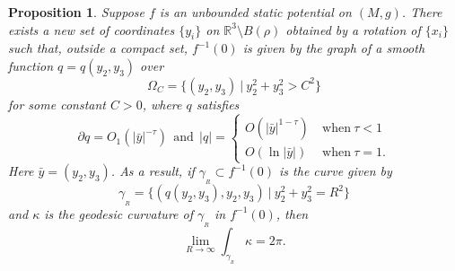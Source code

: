 \documentclass[12pt]{amsart}
\newtheorem{prop}{Proposition}[section]
\theoremstyle{remark}
\numberwithin{equation}{section}
\newcommand{\R}{\mathbb R}
\newcommand{\be}{\begin{equation}}
\newcommand{\ee}{\end{equation}}
\def\p{\partial}
\def\lf{\left}
\def\ri{\right}
\begin{document}
\begin{prop}  \label{prop-AF-static-zeroset}
Suppose $f$ is an unbounded static potential on $(M, g)$.
There exists a new set of  coordinates $\{ y_i \}$ on $  \R^3 \setminus B (\rho)$ obtained by
a rotation of $\{x_i \}$ such that, outside a compact set,
$ f^{-1} (0)  $
is given by the graph of a smooth  function $ q = q(y_2, y_3) $ over
$$ \Omega_C = \{ (y_2, y_3) \ | \ y_2^2 + y_3^2 > C^2 \}  $$
for some constant $ C>0$, where   $ q $ satisfies
\be \label{eq-condition-q}
    \p q   = O_1 (|\bar{y}|^{-\tau} )
\  \ \mathrm{and} \ \
| q | =
\lf\{
\begin{array}{ll}
O( | \bar{y}|^{1-\tau}) & \  \mathrm{when} \   \tau < 1 \\
 O ( \ln |\bar{y}| ) & \  \mathrm{when}   \ \tau = 1.
 \end{array}
 \ri.
\ee
Here $ \bar{y} = (y_2, y_3) $.
As a result,
if $\gamma_{_R} \subset f^{-1}(0) $ is the curve   given by
$$ \gamma_{_R} = \{ ( q( y_2, y_3) , y_2, y_3) \ | \ y_2^2 + y_3^2 = R^2 \}  $$
and $\kappa $ is the geodesic curvature of $ \gamma_{_R} $ in $f^{-1}(0)$, then
\be  \label{eq-g-curvature}
\lim_{R \rightarrow \infty} \int_{\gamma_{_R}}  \kappa = 2 \pi .
\ee
\end{prop}
\end{document}
